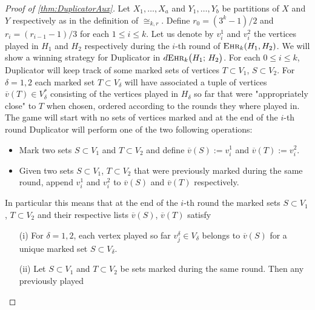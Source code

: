 \documentclass[12pt,notitlepage,a4paper]{article}
\theoremstyle{definition}
\newcommand{\ehr}{\textsc{Ehr}}
\begin{document}
\begin{proof}[Proof of \cref{thm:DuplicatorAux}]
	Let $X_1,\dots,X_a$ and 
	$Y_1,\dots,Y_b$ be partitions of 
	$X$ and $Y$ respectively
	as in the definition of $\cong_{k,r}$.
	Define $r_0=(3^k-1)/2$ and $r_i=(r_{i-1}-1)/3$ for each
	$1\leq i \leq k$. 
	Let us denote by $v^1_i$ and $v^2_i$ the vertices played
	in $H_1$ and $H_2$ respectively during the $i$-th
	round of $\ehr_k(H_1,H_2)$. 
	We will show a winning strategy for Duplicator
	in $d\ehr_{k}\big(H_1;\, H_2\big)$. For each $0\leq i \leq k$,
	Duplicator will	keep track of some marked sets 
	of vertices $T\subset V_1$, $S\subset V_2$. 
	For $\delta=1,2$ each marked set
	$T\subset V_\delta$ will have associated a tuple
	of vertices $\overline{v}(T)\in V_\delta^*$ consisting
	of the vertices played in $H_\delta$ so far that were 
	"appropriately close" to $T$ when chosen,  ordered according
	to the rounds they where played in.
	The game will start with no sets of vertices marked and 
	at the end of the $i$-th
	round Duplicator will perform one of the two
	following operations:
	\begin{itemize}
	\item Mark two sets $S\subset V_1$ and $T\subset V_2$ and
	define $\overline{v}(S):=v^1_i$ and $\overline{v}(T):=v^2_i$.
	\item Given two sets $S\subset V_1$, $T\subset V_2$ that were 
	previously marked during the same round, append $v^1_i$
	and $v^2_i$ to $\overline{v}(S)$ and $\overline{v}(T)$ 
	respectively. 
	\end{itemize}
	In particular this means that at the 
	end of the $i$-th round the marked sets $S\subset V_1$
	, $T\subset V_2$ and their respective lists $\overline{v}(S)$,
	$\overline{v}(T)$ satisfy
	\begin{itemize}
		\item[(i)] For $\delta=1,2$, each vertex played
		so far $v^\delta_j\in V_\delta$ belongs to 
		$\overline{v}(S)$ for a	 unique marked set 
		$S\subset V_\delta$.
		\item[(ii)] Let $S\subset V_1$ and $T\subset V_2$ be sets
		marked during the same round. Then any previously played

\end{itemize}
\end{proof}
\end{document}
